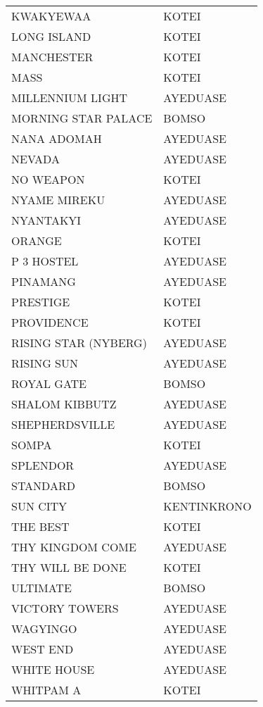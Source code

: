 \begin{longtable}{p{6.5cm}p{6.5cm}}
	KWAKYEWAA & KOTEI \\
	LONG ISLAND & KOTEI \\
	MANCHESTER & KOTEI \\
	MASS & KOTEI \\
	MILLENNIUM LIGHT & AYEDUASE \\
	MORNING STAR PALACE & BOMSO \\
	NANA ADOMAH & AYEDUASE \\
	NEVADA & AYEDUASE \\
	NO WEAPON & KOTEI \\
	NYAME MIREKU & AYEDUASE \\
	NYANTAKYI & AYEDUASE \\
	ORANGE & KOTEI \\
	P 3 HOSTEL & AYEDUASE \\
	PINAMANG & AYEDUASE \\
	PRESTIGE & KOTEI \\
	PROVIDENCE & KOTEI \\
	RISING STAR (NYBERG) & AYEDUASE \\
	RISING SUN & AYEDUASE \\
	ROYAL GATE & BOMSO \\ 
	SHALOM KIBBUTZ & AYEDUASE \\
	SHEPHERDSVILLE & AYEDUASE \\
	SOMPA & KOTEI \\
	SPLENDOR & AYEDUASE \\
	STANDARD & BOMSO \\
	SUN CITY & KENTINKRONO \\
	THE BEST & KOTEI \\
	THY KINGDOM COME & AYEDUASE \\
	THY WILL BE DONE & KOTEI \\
	ULTIMATE & BOMSO \\
	VICTORY TOWERS & AYEDUASE \\
	WAGYINGO & AYEDUASE \\
	WEST END & AYEDUASE \\
	WHITE HOUSE & AYEDUASE \\
	WHITPAM A & KOTEI \\ \hline
\end{longtable}